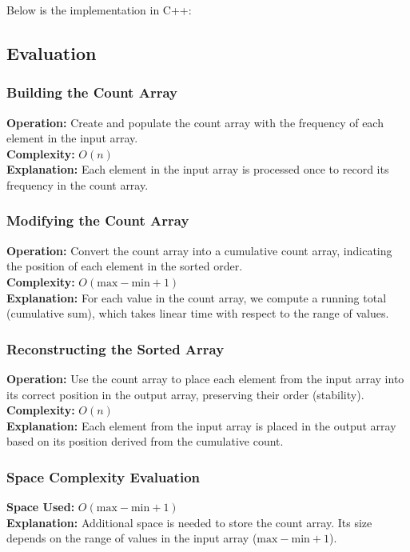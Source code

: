 \begin{minipage}{\linewidth}
    Below is the implementation in C++:
        
\end{minipage}

\subsection{Evaluation}
\subsubsection{Building the Count Array}
\textbf{Operation:} Create and populate the count array with the frequency of each element in the input array. \\
\textbf{Complexity:} \(O(n)\) \\
\textbf{Explanation:} Each element in the input array is processed once to record its frequency in the count array.

\subsubsection{Modifying the Count Array}
\textbf{Operation:} Convert the count array into a cumulative count array, indicating the position of each element in the sorted order. \\
\textbf{Complexity:} \(O(\text{max} - \text{min} + 1)\) \\
\textbf{Explanation:} For each value in the count array, we compute a running total (cumulative sum), which takes linear time with respect to the range of values.

\subsubsection{Reconstructing the Sorted Array}
\textbf{Operation:} Use the count array to place each element from the input array into its correct position in the output array, preserving their order (stability). \\
\textbf{Complexity:} \(O(n)\) \\
\textbf{Explanation:} Each element from the input array is placed in the output array based on its position derived from the cumulative count.

\subsubsection{Space Complexity Evaluation}
\textbf{Space Used:} \(O(\text{max} - \text{min} + 1)\) \\
\textbf{Explanation:} Additional space is needed to store the count array. Its size depends on the range of values in the input array (\(\text{max} - \text{min} + 1\)).

